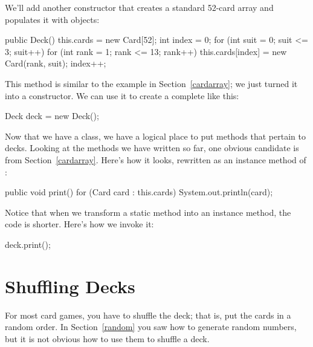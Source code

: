 We'll add another constructor that creates a standard 52-card array and populates it with  objects:

\begin{code}
public Deck() {
    this.cards = new Card[52];
    int index = 0;
    for (int suit = 0; suit <= 3; suit++) {
        for (int rank = 1; rank <= 13; rank++) {
            this.cards[index] = new Card(rank, suit);
            index++;
        }
    }
}
\end{code}

This method is similar to the example in Section~\ref{cardarray}; we just turned it into a constructor.
We can use it to create a complete  like this:

\begin{code}
Deck deck = new Deck();
\end{code}


Now that we have a  class, we have a logical place to put methods that pertain to decks.
Looking at the methods we have written so far, one obvious candidate is  from Section~\ref{cardarray}.
Here's how it looks, rewritten as an instance method of :

\begin{code}
public void print() {
    for (Card card : this.cards) {
        System.out.println(card);
    }
}
\end{code}


Notice that when we transform a static method into an instance method, the code is shorter.
Here's how we invoke it:

\begin{code}
deck.print();
\end{code}


\section{Shuffling Decks}
\label{shuffle}


For most card games, you have to shuffle the deck; that is, put the cards in a random order.
In Section~\ref{random} you saw how to generate random numbers, but it is not obvious how to use them to shuffle a deck.

